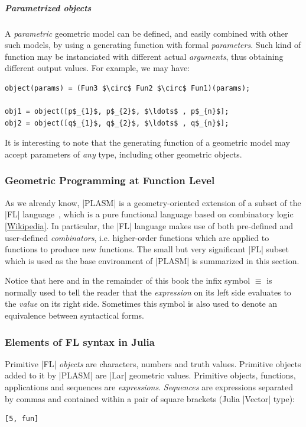 \subparagraph{Parametrized objects}

A \textit{parametric} geometric model can be defined, and easily
combined with other such models, by using a generating function with
{formal} \emph{parameters}.  Such kind of function may be instanciated
with different {actual} \emph{arguments}, thus obtaining different
output values.  For example, we may have:
\begin{lstlisting}[language=JuliaLocal, style=julia, mathescape = true]
object(params) = (Fun3 $\circ$ Fun2 $\circ$ Fun1)(params);

obj1 = object([p$_{1}$, p$_{2}$, $\ldots$ , p$_{n}$];
obj2 = object([q$_{1}$, q$_{2}$, $\ldots$ , q$_{n}$];
\end{lstlisting}
It is interesting to note that the generating function of a geometric
model may accept parameters of \emph{any} type, including other
geometric objects.



\subsubsection*{Geometric Programming at Function Level}
\label{sec:FL}

As we already know, |PLASM| is a geometry-oriented extension of a subset of
the |FL| language~\cite{BWW90,IBM:RJ7100}, which is a pure
functional language based on combinatory logic \href{https://en.wikipedia.org/wiki/Combinatory_logic}{[Wikipedia]}.  In particular, the
|FL| language makes use of both pre-defined and user-defined
\emph{combinators}, i.e. higher-order functions which are applied
to functions to produce new functions.  The small but very significant
|FL| subset which is used as the base environment of |PLASM| is summarized
in this section.  

Notice that here and in the remainder of this book the infix symbol
$\equiv$ is normally used to tell the reader that the
\emph{expression} on its left side evaluates to the \emph{value} on
its right side.  Sometimes this symbol is also used to denote an
equivalence between syntactical forms.




\subsubsection*{Elements of {FL} syntax in Julia}
\label{sec:FLsyntax}


Primitive |FL| \emph{objects} are characters, numbers and truth values.  Primitive objects added to it by |PLASM| are |Lar| geometric values.
Primitive objects, functions, applications and sequences are 
\emph{expressions}.
\emph{Sequences} are expressions separated by commas and contained within a pair
of square brackets (Julia |Vector| type):
\begin{lstlisting}[language=JuliaLocal, style=julia, mathescape = true]
[5, fun]
\end{lstlisting}

